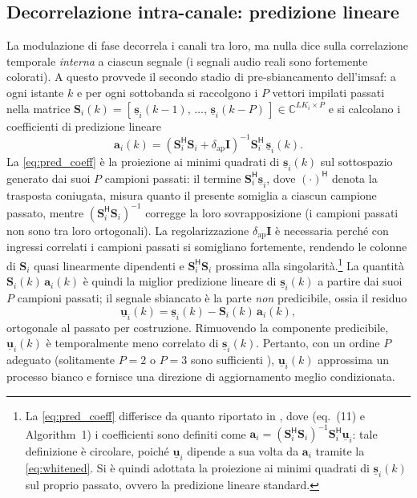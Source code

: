 \documentclass[11pt,a4paper]{article}
\begin{document}
	\subsection{Decorrelazione intra-canale: predizione lineare}\label{ssec:whitening}
	La modulazione di fase decorrela i canali tra loro, ma nulla dice sulla correlazione temporale \emph{interna} a ciascun segnale (i segnali audio reali sono fortemente colorati).
	A questo provvede il secondo stadio di pre-sbiancamento dell'\ac{imsaf}: a ogni istante $k$ e per ogni sottobanda si raccolgono i $P$ vettori impilati passati nella matrice $\mathbf{S}_i(k) = [\,\underline{\mathbf{s}}_i(k-1),\, \dots,\, \underline{\mathbf{s}}_i(k-P)\,] \in \mathbb{C}^{LK_i \times P}$ e si calcolano i coefficienti di predizione lineare
	\begin{equation}
		\mathbf{a}_i(k) = \left(\mathbf{S}_i^{\mathsf{H}}\mathbf{S}_i + \delta_{\mathrm{ap}}\mathbf{I}\right)^{-1} \mathbf{S}_i^{\mathsf{H}}\, \underline{\mathbf{s}}_i(k).
		\label{eq:pred_coeff}
	\end{equation}
	La \eqref{eq:pred_coeff} è la proiezione ai minimi quadrati di $\underline{\mathbf{s}}_i(k)$ sul sottospazio generato dai suoi $P$ campioni passati: il termine $\mathbf{S}_i^{\mathsf{H}}\underline{\mathbf{s}}_i$, dove $(\cdot)^{\mathsf{H}}$ denota la trasposta coniugata, misura quanto il presente somiglia a ciascun campione passato, mentre $(\mathbf{S}_i^{\mathsf{H}}\mathbf{S}_i)^{-1}$ corregge la loro sovrapposizione (i campioni passati non sono tra loro ortogonali). La regolarizzazione $\delta_{\mathrm{ap}}\mathbf{I}$ è necessaria perché con ingressi correlati i campioni passati si somigliano fortemente, rendendo le colonne di $\mathbf{S}_i$ quasi linearmente dipendenti e $\mathbf{S}_i^{\mathsf{H}}\mathbf{S}_i$ prossima alla singolarità.\footnote{La \eqref{eq:pred_coeff} differisce da quanto riportato in \cite{11464373}, dove (eq.~(11) e Algorithm~1) i coefficienti sono definiti come $\mathbf{a}_i = (\mathbf{S}_i^{\mathsf{H}}\mathbf{S}_i)^{-1}\mathbf{S}_i^{\mathsf{H}}\underline{\mathbf{u}}_i$: tale definizione è circolare, poiché $\underline{\mathbf{u}}_i$ dipende a sua volta da $\mathbf{a}_i$ tramite la \eqref{eq:whitened}. Si è quindi adottata la proiezione ai minimi quadrati di $\underline{\mathbf{s}}_i(k)$ sul proprio passato, ovvero la predizione lineare standard.}
	La quantità $\mathbf{S}_i(k)\,\mathbf{a}_i(k)$ è quindi la miglior predizione lineare di $\underline{\mathbf{s}}_i(k)$ a partire dai suoi $P$ campioni passati; il segnale sbiancato è la parte \emph{non} predicibile, ossia il residuo
	\begin{equation}
		\underline{\mathbf{u}}_i(k) = \underline{\mathbf{s}}_i(k) - \mathbf{S}_i(k)\,\mathbf{a}_i(k),
		\label{eq:whitened}
	\end{equation}
	ortogonale al passato per costruzione. Rimuovendo la componente predicibile, $\underline{\mathbf{u}}_i(k)$ è temporalmente meno correlato di $\underline{\mathbf{s}}_i(k)$. Pertanto, con un ordine $P$ adeguato (solitamente $P = 2$ o $P=3$ sono sufficienti \cite{11464373}), $\underline{\mathbf{u}}_i(k)$ approssima un processo bianco e fornisce una direzione di aggiornamento meglio condizionata.
	
\end{document}
